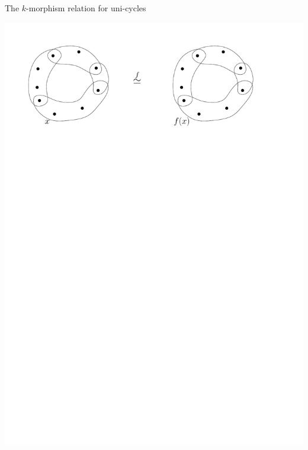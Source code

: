 \documentclass[11pt]{beamer}
\begin{document}
	\begin{frame}{The $k$-morphism relation for uni-cycles}
	\begin{center}
		\vspace{0.48 em}
		\includegraphics[width=0.95\linewidth]{KmorphicCycles2.pdf}
	\end{center}
	\end{frame}
\end{document}
